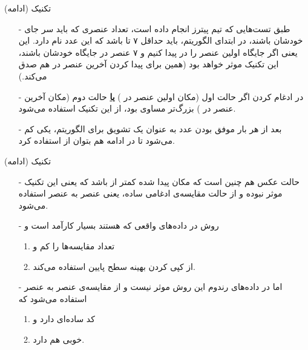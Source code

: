 \begin{frame}{تکنیک  (ادامه)}
\begin{itemize}\itemr
\item[-]
طبق تست‌هایی که تیم پیترز انجام داده است، تعداد عنصری که باید سر جای خودشان باشند، در ابتدای الگوریتم، باید حداقل ۷ تا باشد که این عدد نام  دارد. این یعنی اگر جایگاه اولین عنصر 
را در 
پیدا کنیم و ۷ عنصر در جایگاه خودشان باشند، این تکنیک موثر خواهد بود (همین برای پیدا کردن آخرین عنصر  در  هم صدق می‌کند.)

\item[-]
در ادغام کردن اگر حالت اول (مکان اولین عنصر  در ) \textbf{\underline{یا}} حالت دوم (مکان آخرین عنصر  در ) بزرگ‌تر مساوی  بود، از این تکنیک استفاده می‌شود.

\item[-]
بعد از هر بار موفق بودن  عدد  به عنوان یک تشویق برای الگوریتم، یکی کم می‌شود تا در ادامه هم بتوان از  استفاده کرد.
\end{itemize}
\end{frame}

\begin{frame}{تکنیک  (ادامه)}
\begin{itemize}\itemr
\item[-]
حالت عکس هم چنین است که مکان پیدا شده کمتر از 
باشد که یعنی این تکنیک موثر نبوده و از حالت مقایسه‌ی ادغامی ساده، یعنی عنصر به عنصر استفاده می‌شود.

\item[-]
روش  در داده‌های واقعی که  هستند بسیار کارآمد است و
\begin{enumerate}\itemr
\item
تعداد مقایسه‌ها را کم و
\item
از کپی کردن بهینه سطح پایین استفاده می‌کند.
\end{enumerate}

\item[-]
اما در داده‌های رندوم این روش موثر نیست و از مقایسه‌ی عنصر به عنصر استفاده می‌شود که 
\begin{enumerate}\itemr
\item
کد ساده‌ای دارد و
\item
{}
 خوبی هم دارد.
\end{enumerate}
\end{itemize}
\end{frame}

